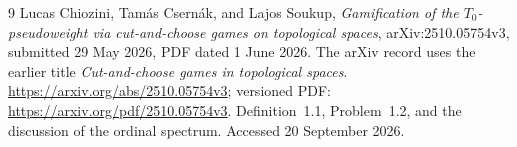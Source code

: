 \documentclass[11pt,a4paper]{article}
\theoremstyle{definition}
\theoremstyle{remark}
\begin{document}
\begin{thebibliography}{9}
Lucas Chiozini, Tam\'as Csern\'ak, and Lajos Soukup,
\emph{Gamification of the $T_0$-pseudoweight via cut-and-choose games on
 topological spaces}, arXiv:2510.05754v3, submitted 29 May 2026,
PDF dated 1 June 2026.
The arXiv record uses the earlier title \emph{Cut-and-choose games in
topological spaces}.
\url{https://arxiv.org/abs/2510.05754v3};
versioned PDF: \url{https://arxiv.org/pdf/2510.05754v3}.
Definition~1.1, Problem~1.2, and the discussion of the ordinal spectrum.
Accessed 20 September 2026.
\end{thebibliography}
\end{document}
